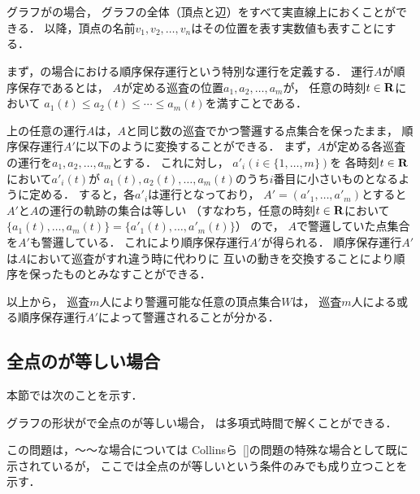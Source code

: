\section{{\graphLine}}
\label{section: line}

グラフが{\graphLine}の場合，
グラフの全体（頂点と辺）をすべて実直線上におくことができる．
以降，頂点の名前$v_1, v_2, \ldots, v_n$はその位置を表す実数値も表すことにする．

まず，{\graphLine}の場合における順序保存運行という特別な運行を定義する．
運行$A$が順序保存であるとは，
$A$が定める巡査の位置$a_1, a_2, \ldots, a_m$が，
任意の時刻$t \in \mathbf R$において
$a_1(t) \leq a_2(t) \leq \cdots \leq a_m(t)$を満すことである．

{\graphLine}上の任意の運行$A$は，$A$と同じ数の巡査でかつ警邏する点集合を保ったまま，
順序保存運行$A'$に以下のように変換することができる．
%
まず，$A$が定める各巡査の運行を$a_1, a_2, \ldots, a_m$とする．
これに対し，
$a'_i (i \in \{1, \ldots, m\})$を
各時刻$t \in \mathbf R$において$a' _i(t)$が
$a_1(t), a_2(t), \ldots, a_m(t)$のうち$i$番目に小さいものとなるように定める．
すると，各$a' _i$は運行となっており，
$A' = (a' _1, \ldots, a' _m)$とすると
$A'$と$A$の運行の軌跡の集合は等しい
（すなわち，任意の時刻$t \in \mathbf R$において
$\{ a_1(t), \ldots, a_m(t) \} = \{ a'_1(t), \ldots, a'_m(t) \}$）
ので，
$A$で警邏していた点集合を$A'$も警邏している．
これにより順序保存運行$A'$が得られる．
%
順序保存運行$A'$は$A$において巡査がすれ違う時に代わりに
互いの動きを交換することにより順序を保ったものとみなすことができる．

以上から，
巡査$m$人により警邏可能な任意の頂点集合$W$は，
巡査$m$人による或る順序保存運行$A'$によって警邏されることが分かる．




\subsection{全点の{\idletime}が等しい場合}
\label{subsec:LineUnaryTimelimit}


本節では次のことを示す．

\begin{theo}
  \label{theo:LineEqualTimelimit}
  グラフの形状が{\graphLine}で全点の{\idletime}が等しい場合，
  {\patProb}は多項式時間で解くことができる．
\end{theo}

この問題は，～～な場合については Collinsら~\ref{}の問題の特殊な場合として既に示されているが，
ここでは全点の{\idletime}が等しいという条件のみでも成り立つことを示す．


